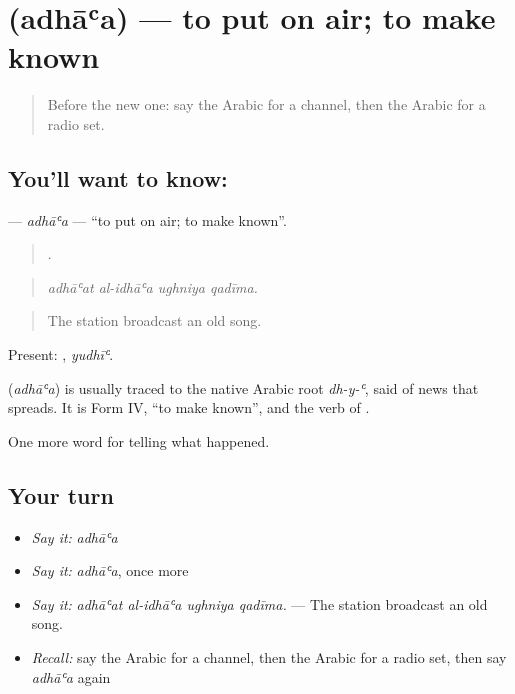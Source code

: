 \section[\texorpdfstring{\ar{أذاع} (adhāʿa)}{أذاع (adhāʿa)}]{ (adhāʿa) — to put on air; to make known}

\label{lesson:AR-C297-adhaa}



\begin{quote}
Before the new one: say the Arabic for a channel, then the Arabic for a radio set.
\end{quote}

\subsection*{You'll want to know: }
\textbf{} — \emph{adhāʿa} — \textquotedblleft{}to put on air; to make known\textquotedblright{}.

\begin{quote}
   .
\end{quote}

\begin{quote}
\emph{adhāʿat al-idhāʿa ughniya qadīma.}
\end{quote}

\begin{quote}
The station broadcast an old song.
\end{quote}

Present: , \emph{yudhīʿ}.

\begin{cousinweb}
\textbf{} (\emph{adhāʿa}) is usually traced to the native Arabic root \emph{dh-y-ʿ}, said of news that spreads. It is Form IV, \textquotedblleft{}to make known\textquotedblright{}, and the verb of .
\end{cousinweb}

\begin{grammarlens}[title={What you've built}]
One more word for telling what happened.
\end{grammarlens}

\subsection*{Your turn}
\begin{itemize}
\raggedright
  \item \emph{Say it:} \emph{adhāʿa}
  \item \emph{Say it:} \emph{adhāʿa}, once more
  \item \emph{Say it:} \emph{adhāʿat al-idhāʿa ughniya qadīma.} — The station broadcast an old song.
  \item \emph{Recall:} say the Arabic for a channel, then the Arabic for a radio set, then say \emph{adhāʿa} again
\end{itemize}

